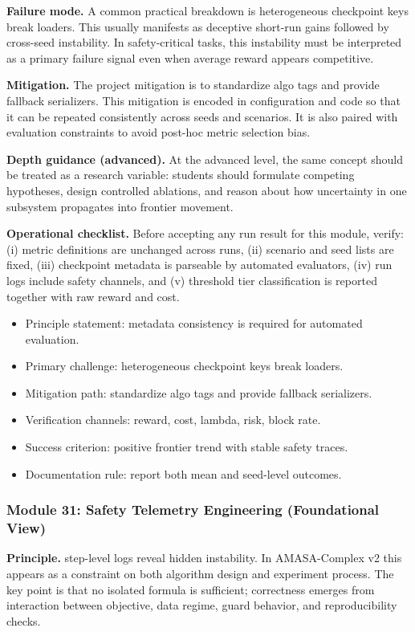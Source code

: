 \documentclass[conference]{IEEEtran}
\begin{document}
\textbf{Failure mode.} A common practical breakdown is heterogeneous checkpoint keys break loaders. This usually manifests as deceptive short-run gains followed by cross-seed instability. In safety-critical tasks, this instability must be interpreted as a primary failure signal even when average reward appears competitive.

\textbf{Mitigation.} The project mitigation is to standardize algo tags and provide fallback serializers. This mitigation is encoded in configuration and code so that it can be repeated consistently across seeds and scenarios. It is also paired with evaluation constraints to avoid post-hoc metric selection bias.

\textbf{Depth guidance (advanced).} At the advanced level, the same concept should be treated as a research variable: students should formulate competing hypotheses, design controlled ablations, and reason about how uncertainty in one subsystem propagates into frontier movement.

\textbf{Operational checklist.} Before accepting any run result for this module, verify: (i) metric definitions are unchanged across runs, (ii) scenario and seed lists are fixed, (iii) checkpoint metadata is parseable by automated evaluators, (iv) run logs include safety channels, and (v) threshold tier classification is reported together with raw reward and cost.

\begin{itemize}[leftmargin=*]
  \item Principle statement: metadata consistency is required for automated evaluation.
  \item Primary challenge: heterogeneous checkpoint keys break loaders.
  \item Mitigation path: standardize algo tags and provide fallback serializers.
  \item Verification channels: reward, cost, lambda, risk, block rate.
  \item Success criterion: positive frontier trend with stable safety traces.
  \item Documentation rule: report both mean and seed-level outcomes.
\end{itemize}


\subsubsection{Module 31: Safety Telemetry Engineering (Foundational View)}
\textbf{Principle.} step-level logs reveal hidden instability. In AMASA-Complex v2 this appears as a constraint on both algorithm design and experiment process. The key point is that no isolated formula is sufficient; correctness emerges from interaction between objective, data regime, guard behavior, and reproducibility checks.
\end{document}
